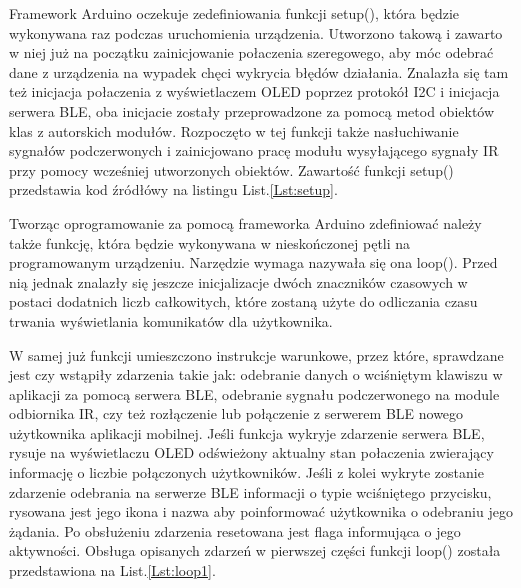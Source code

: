 \documentclass[12pt,twoside]{article}
\begin{document}


Framework Arduino oczekuje zedefiniowania funkcji setup(), która będzie wykonywana raz podczas uruchomienia urządzenia. Utworzono takową i zawarto w niej już na początku zainicjowanie połaczenia szeregowego, aby móc odebrać dane z urządzenia na wypadek chęci wykrycia błędów działania. Znalazła się tam też inicjacja połaczenia z wyświetlaczem OLED poprzez protokół I2C i inicjacja serwera BLE, oba inicjacie zostały przeprowadzone za pomocą metod obiektów klas z autorskich modułów. Rozpoczęto w tej funkcji także nasłuchiwanie sygnałów podczerwonych i zainicjowano pracę modułu wysyłającego sygnały IR przy pomocy wcześniej utworzonych obiektów. Zawartość funkcji setup() przedstawia kod źródłówy na listingu List.\ref*{Lst:setup}.



Tworząc oprogramowanie za pomocą frameworka Arduino zdefiniować należy także funkcję, która będzie wykonywana w nieskończonej pętli na programowanym urządzeniu. Narzędzie wymaga nazywała się ona loop(). Przed nią jednak znalazły się jeszcze inicjalizacje dwóch znaczników czasowych w postaci dodatnich liczb całkowitych, które zostaną użyte do odliczania czasu trwania wyświetlania komunikatów dla użytkownika. 

W samej już funkcji umieszczono instrukcje warunkowe, przez które, sprawdzane jest czy wstąpiły zdarzenia takie jak: odebranie danych o wciśniętym klawiszu w aplikacji za pomocą serwera BLE, odebranie sygnału podczerwonego na module odbiornika IR, czy też rozłączenie lub połączenie z serwerem BLE nowego użytkownika aplikacji mobilnej. Jeśli funkcja wykryje zdarzenie serwera BLE, rysuje na wyświetlaczu OLED odświeżony aktualny stan połaczenia zwierający informację o liczbie połączonych użytkowników. Jeśli z kolei wykryte zostanie zdarzenie odebrania na serwerze BLE informacji o typie wciśniętego przycisku, rysowana jest jego ikona i nazwa aby poinformować użytkownika o odebraniu jego żądania. Po obsłużeniu zdarzenia resetowana jest flaga informująca o jego aktywności. Obsługa opisanych zdarzeń w pierwszej części funkcji loop() została przedstawiona na List.\ref*{Lst:loop1}.

\end{document}
